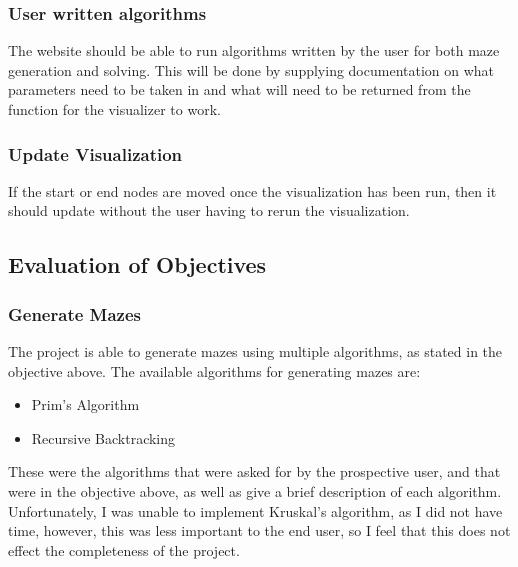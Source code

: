 \documentclass[titlepage]{article}
\begin{document}
\subsubsection{User written algorithms}
The website should be able to run algorithms written by the user for both maze generation and solving. This will be done by supplying documentation on what parameters need to be taken in and what will need to be returned from the function for the visualizer to work.

\subsubsection{Update Visualization}
If the start or end nodes are moved once the visualization has been run, then it should update without the user having to rerun the visualization.

\subsection{Evaluation of Objectives}
\subsubsection{Generate Mazes}
The project is able to generate mazes using multiple algorithms, as stated in the objective above. The available algorithms for generating mazes are:
\begin{itemize}
    \item Prim's Algorithm
    \item Recursive Backtracking
\end{itemize}
These were the algorithms that were asked for by the prospective user, and that were in the objective above, as well as give a brief description of each algorithm. Unfortunately, I was unable to implement Kruskal's algorithm, as I did not have time, however, this was less important to the end user, so I feel that this does not effect the completeness of the project.
\end{document}
